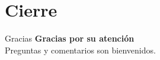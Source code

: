 \section*{Cierre}

\begin{frame}{Gracias}
  \centering
  \vfill
  \textbf{Gracias por su atención}\\[0.5cm]
  Preguntas y comentarios son bienvenidos.
  \vfill
\end{frame}
